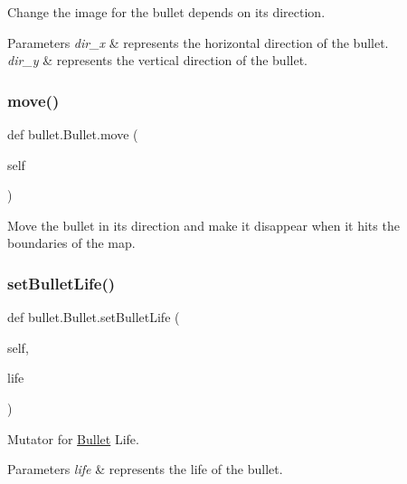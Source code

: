 Change the image for the bullet depends on its direction. 


\begin{DoxyParams}{Parameters}
{\em dir\+\_\+x} & represents the horizontal direction of the bullet. \\
\hline
{\em dir\+\_\+y} & represents the vertical direction of the bullet. \\
\hline
\end{DoxyParams}
\mbox{\label{classbullet_1_1_bullet_a9e9ce6492e67df70a832981990f88eeb}} 
\subsubsection{\texorpdfstring{move()}{move()}}
{\footnotesize\ttfamily def bullet.\+Bullet.\+move (\begin{DoxyParamCaption}\item[{}]{self }\end{DoxyParamCaption})}



Move the bullet in its direction and make it disappear when it hits the boundaries of the map. 

\mbox{\label{classbullet_1_1_bullet_a71d9760cab8d3e819772b17a6878518a}} 
\subsubsection{\texorpdfstring{setBulletLife()}{setBulletLife()}}
{\footnotesize\ttfamily def bullet.\+Bullet.\+set\+Bullet\+Life (\begin{DoxyParamCaption}\item[{}]{self,  }\item[{}]{life }\end{DoxyParamCaption})}



Mutator for \mbox{\hyperlink{classbullet_1_1_bullet}{Bullet}} Life. 


\begin{DoxyParams}{Parameters}
{\em life} & represents the life of the bullet. \\
\hline
\end{DoxyParams}
\mbox{\label{classbullet_1_1_bullet_a6aa6749c184160cf33aaa7af4ea62ef1}} 
